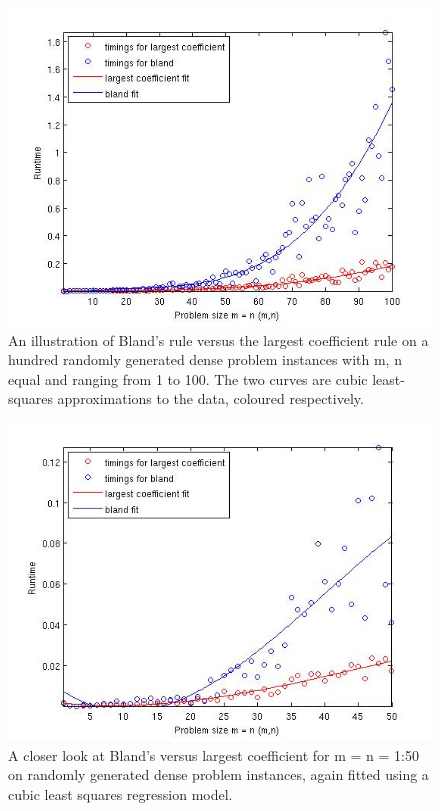 \documentclass[9pt]{article}
\begin{document}
\begin{small}
\begin{figure}[tbp]
\centering
\includegraphics[scale=0.5]{m100blandversuslc.jpg}
\caption{An illustration of Bland's rule versus the largest coefficient rule on
a hundred randomly generated dense problem instances with m, n equal and ranging from 1 to
100. The two curves are cubic least-squares approximations to the data, coloured respectively.}
\end{figure}

\begin{figure}[tbp]
\centering
\includegraphics[scale=0.5]{m50blandversuslc.jpg}
\caption{A closer look at Bland's versus largest coefficient for m = n = 1:50 on randomly generated dense
problem instances, again fitted using a cubic least squares regression model.}
\end{figure}


\end{small}
\end{document}
